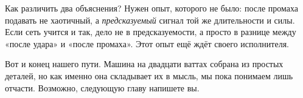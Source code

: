 Как различить два объяснения? Нужен опыт, которого не было: после промаха подавать не хаотичный, а \emph{предсказуемый} сигнал той же длительности и силы. Если сеть учится и так, дело не в предсказуемости, а просто в разнице между «после удара» и «после промаха». Этот опыт ещё ждёт своего исполнителя.

Вот и конец нашего пути. Машина на двадцати ваттах собрана из простых деталей, но как именно она складывает их в мысль, мы пока понимаем лишь отчасти. Возможно, следующую главу напишете вы.

